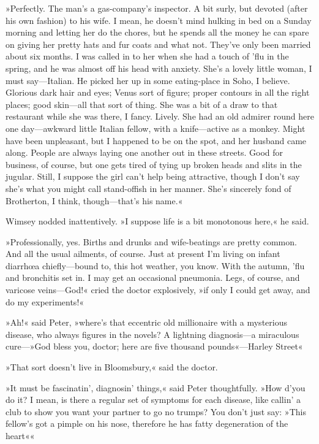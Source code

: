 »Perfectly. The man's a gas-company's inspector. A bit surly, but devoted (after his own fashion) to his wife. I mean, he doesn't mind hulking in bed on a Sunday morning and letting her do the chores, but he spends all the money he can spare on giving her pretty hats and fur coats and what not. They've only been married about six months. I was called in to her when she had a touch of 'flu in the spring, and he was almost off his head with anxiety. She's a lovely little woman, I must say—Italian. He picked her up in some eating-place in Soho, I believe. Glorious dark hair and eyes; Venus sort of figure; proper contours in all the right places; good skin—all that sort of thing. She was a bit of a draw to that restaurant while she was there, I fancy. Lively. She had an old admirer round here one day—awkward little Italian fellow, with a knife—active as a monkey. Might have been unpleasant, but I happened to be on the spot, and her husband came along. People are always laying one another out in these streets. Good for business, of course, but one gets tired of tying up broken heads and slits in the jugular. Still, I suppose the girl can't help being attractive, though I don't say she's what you might call stand-offish in her manner. She's sincerely fond of Brotherton, I think, though—that's his name.«

Wimsey nodded inattentively. »I suppose life is a bit monotonous here,« he said.

»Professionally, yes. Births and drunks and wife-beatings are pretty common. And all the usual ailments, of course. Just at present I'm living on infant diarrhœa chiefly—bound to, this hot weather, you know. With the autumn, 'flu and bronchitis set in. I may get an occasional pneumonia. Legs, of course, and varicose veins—God!« cried the doctor explosively, »if only I could get away, and do my experiments!«

»Ah!« said Peter, »where's that eccentric old millionaire with a mysterious disease, who always figures in the novels? A lightning diagnosis—a miraculous cure—»God bless you, doctor; here are five thousand pounds«—Harley Street\longdash«

»That sort doesn't live in Bloomsbury,« said the doctor.

»It must be fascinatin', diagnosin' things,« said Peter thoughtfully. »How d'you do it? I mean, is there a regular set of symptoms for each disease, like callin' a club to show you want your partner to go no trumps? You don't just say: »This fellow's got a pimple on his nose, therefore he has fatty degeneration of the heart\longdash««

